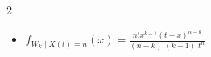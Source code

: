 \documentclass[8pt]{article}
\begin{document}
\begin{multicols*}{2}
\begin{itemize}
            \begin{align*}
                f\bigl(w_1, w_2, \cdots, w_n \mid X\left(t\right) = n\bigr) & = \frac{P\left(S_n > t - w_n\right)\prod_{i = 1}^nf_{S_{i - 1}}\left(w_i - w_{i - 1}\right)}{\frac{\left(\lambda t\right)^n\mathrm{e}^{-\lambda t}}{n!}} \\
                & = \frac{n!\mathrm{e}^{-\lambda\left(t - w_n\right)}\prod_{i = 1}^n\lambda\mathrm{e}^{-\lambda\left(w_i - w_{i - 1}\right)}}{\left(\lambda t\right)^n\mathrm{e}^{-\lambda t}} = \frac{n!}{t^n}.
            \end{align*}
            \item $f_{W_k \mid X(t) = n}\left(x\right) = \frac{n!x^{k - 1}\left(t - x\right)^{n - k}}{\left(n - k\right)!\left(k - 1\right)!t^n}$
        \end{itemize}
    \end{multicols*}
\end{document}
